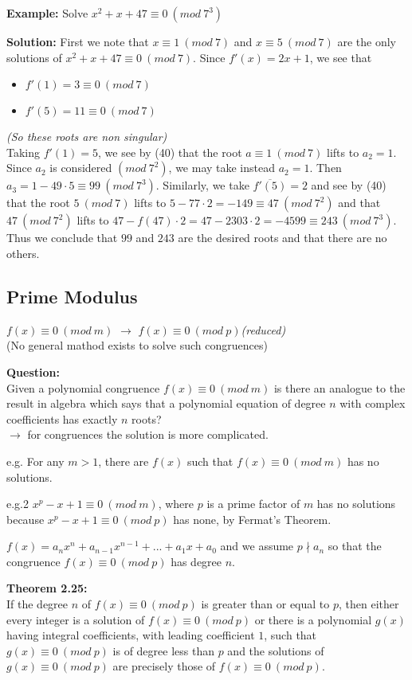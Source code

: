 \documentclass[a4paper]{article}
\begin{document}
\textbf{Example:}
Solve $x^2+x+47\equiv 0\ (mod\ 7^3)$

\textbf{Solution:}
First we note that $x\equiv 1\ (mod\ 7)$ and $x\equiv 5\ (mod\ 7)$ are the only solutions of $x^2+x+47\equiv 0\ (mod\ 7)$. Since $f'(x)=2x+1$, we see that
\begin{itemize}
    \item $f'(1)=3\equiv 0\ (mod\ 7)$
    \item $f'(5)=11\equiv 0\ (mod\ 7)$
\end{itemize}
\textit{(So these roots are non singular)}\\
Taking $f'(1)=5$, we see by (40) that the root $a\equiv 1\ (mod\ 7)$ lifts to $a_2=1$. Since $a_2$ is considered $(mod\ 7^2)$, we may take instead $a_2=1$. Then $a_3=1-49\cdot5\equiv 99\ (mod\ 7^3)$. Similarly, we take $\overline{f'(5)}=2$ and see by (40) that the root $5\ (mod\ 7)$ lifts to $5-77\cdot2=-149\equiv 47\ (mod\ 7^2)$ and that $47\ (mod\ 7^2)$ lifts to $47-f(47)\cdot2=47-2303\cdot2=-4599\equiv 243\ (mod\ 7^3)$. Thus we conclude that $99$ and $243$ are the desired roots and that there are no others.


\subsection{Prime Modulus}

$f(x)\equiv 0\ (mod\ m)$ $\to$ $f(x)\equiv 0\ (mod\ p)$\quad \textit{(reduced)}\\
(No general mathod exists to solve such congruences)

\textbf{Question:}\\
Given a polynomial congruence $f(x)\equiv 0\ (mod\ m)$ is there an analogue to the result in algebra which says that a polynomial equation of degree $n$ with complex coefficients has exactly $n$ roots?\\
$\to$ for congruences the solution is more complicated.

e.g. For any $m>1$, there are $f(x)$ such that $f(x)\equiv 0\ (mod\ m)$ has no solutions.

e.g.2 $x^p-x+1\equiv 0\ (mod\ m)$, where $p$ is a prime factor of $m$ has no solutions because $x^p-x+1\equiv 0\ (mod\ p)$ has none, by Fermat's Theorem.

$f(x)=a_nx^n+a_{n-1}x^{n-1}+...+a_1x+a_0$ and we assume $p\nmid a_n$ so that the congruence $f(x)\equiv 0\ (mod\ p)$ has degree $n$.

\textbf{Theorem 2.25:}\\
If the degree $n$ of $f(x)\equiv 0\ (mod\ p)$ is greater than or equal to $p$, then either every integer is a solution of $f(x)\equiv 0\ (mod\ p)$ or there is a polynomial $g(x)$ having integral coefficients, with leading coefficient $1$, such that $g(x)\equiv 0\ (mod\ p)$ is of degree less than $p$ and the solutions of $g(x)\equiv 0\ (mod\ p)$ are precisely those of $f(x)\equiv 0\ (mod\ p)$.
\end{document}
